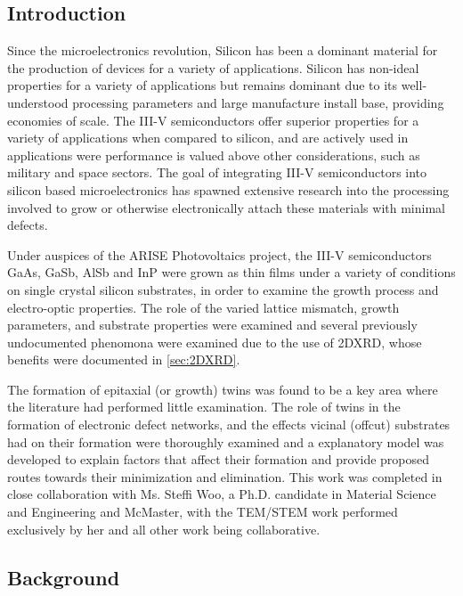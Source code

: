 \subsection{Introduction}
Since the microelectronics revolution, Silicon has been a dominant material 
for the production of devices for a variety of applications. Silicon has 
non-ideal properties for a variety of applications but remains dominant due 
to its well-understood processing parameters and large manufacture install 
base, providing economies of scale. The III-V semiconductors offer superior 
properties for a variety of applications when compared to silicon, and are 
actively used in applications were performance is valued above other 
considerations, such as military and space sectors. The goal of integrating 
III-V semiconductors into silicon based microelectronics has spawned extensive 
research into the processing involved to grow or otherwise electronically 
attach these materials with minimal defects.

Under auspices of the ARISE Photovoltaics project, the III-V 
semiconductors GaAs, GaSb, AlSb and InP were grown as thin films under a 
variety of conditions on single crystal silicon substrates, in order to 
examine the growth process and electro-optic properties. The role of the 
varied lattice mismatch, growth parameters, and substrate properties were 
examined and several previously undocumented phenomona were examined due to 
the use of 2DXRD, whose benefits were documented in \cref{sec:2DXRD}.

The formation of epitaxial (or growth) twins was found to be a key area where 
the literature had performed little examination. The role of twins in the 
formation of electronic defect networks, and the effects vicinal (offcut) 
substrates had on their formation were thoroughly examined and a 
explanatory model was developed to explain factors that affect their formation 
and provide proposed routes towards their minimization and 
elimination\cite{devenyi_jap}. This work was completed in close collaboration 
with Ms. Steffi Woo, a Ph.D. candidate in Material Science and Engineering and 
McMaster, with the TEM/STEM work performed exclusively by her and all other 
work being collaborative.

\subsection{Background}

